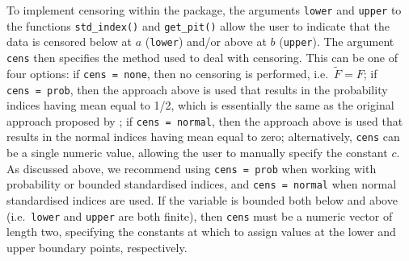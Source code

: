 To implement censoring within the  package, the arguments \texttt{lower} and \texttt{upper} to the functions \texttt{std\_index()} and \texttt{get\_pit()} allow the user to indicate that the data is censored below at \(a\) (\texttt{lower}) and/or above at \(b\) (\texttt{upper}). The argument \texttt{cens} then specifies the method used to deal with censoring. This can be one of four options: if \texttt{cens\ =\ \textquotesingle{}none\textquotesingle{}}, then no censoring is performed, i.e.~\(\tilde{F} = F\); if \texttt{cens\ =\ \textquotesingle{}prob\textquotesingle{}}, then the approach above is used that results in the probability indices having mean equal to 1/2, which is essentially the same as the original approach proposed by \cite{StaggeEtAl2015}; if \texttt{cens\ =\ \textquotesingle{}normal\textquotesingle{}}, then the approach above is used that results in the normal indices having mean equal to zero; alternatively, \texttt{cens} can be a single numeric value, allowing the user to manually specify the constant \(c\). As discussed above, we recommend using \texttt{cens\ =\ \textquotesingle{}prob\textquotesingle{}} when working with probability or bounded standardised indices, and \texttt{cens\ =\ \textquotesingle{}normal\textquotesingle{}} when normal standardised indices are used. If the variable is bounded both below and above (i.e.~\texttt{lower} and \texttt{upper} are both finite), then \texttt{cens} must be a numeric vector of length two, specifying the constants at which to assign values at the lower and upper boundary points, respectively.



\address{%
Sam Allen\\
ETH Zürich\\%
Seminar for Statistics\\ Rämistrasse 101\\ 8092 Zurich, Switzerland\\
%
%
\textit{ORCiD: \href{https://orcid.org/0000-0003-1971-8277}{0000-0003-1971-8277}}\\%
\href{mailto:sam.allen@stat.math.ethz.ch}{\nolinkurl{sam.allen@stat.math.ethz.ch}}%
}

\address{%
Noelia Otero\\
University of Bern and Oeschger Centre for Climate Change Research\\%
Institute of Geography\\ Hallerstrasse 12\\ 3012 Bern, Switzerland\\
%
%
\textit{ORCiD: \href{https://orcid.org/0000-0003-3217-3945}{0000-0003-3217-3945}}\\%
\href{mailto:noelia.otero@unibe.ch}{\nolinkurl{noelia.otero@unibe.ch}}%
}
